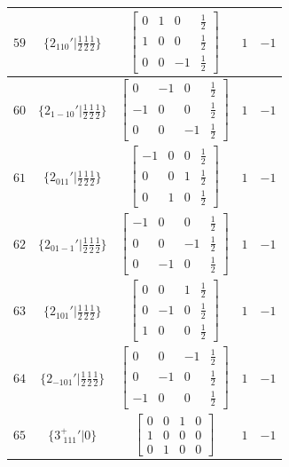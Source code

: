 \documentclass[fleqn,8pt]{jsarticle}
\begin{document}
\begin{longtable}{ccccc}
$ 59 $ & $ \{2{}_{110}{}'|\frac{1}{2} \frac{1}{2} \frac{1}{2}\} $ & $ \begin{bmatrix} 0 & 1 & 0 & \frac{1}{2} \\ 1 & 0 & 0 & \frac{1}{2} \\ 0 & 0 & -1 & \frac{1}{2} \end{bmatrix} $ & $ 1 $ & $ -1 $ \\ \hline
$ 60 $ & $ \{2{}_{1-10}{}'|\frac{1}{2} \frac{1}{2} \frac{1}{2}\} $ & $ \begin{bmatrix} 0 & -1 & 0 & \frac{1}{2} \\ -1 & 0 & 0 & \frac{1}{2} \\ 0 & 0 & -1 & \frac{1}{2} \end{bmatrix} $ & $ 1 $ & $ -1 $ \\ \hline
$ 61 $ & $ \{2{}_{011}{}'|\frac{1}{2} \frac{1}{2} \frac{1}{2}\} $ & $ \begin{bmatrix} -1 & 0 & 0 & \frac{1}{2} \\ 0 & 0 & 1 & \frac{1}{2} \\ 0 & 1 & 0 & \frac{1}{2} \end{bmatrix} $ & $ 1 $ & $ -1 $ \\ \hline
$ 62 $ & $ \{2{}_{01-1}{}'|\frac{1}{2} \frac{1}{2} \frac{1}{2}\} $ & $ \begin{bmatrix} -1 & 0 & 0 & \frac{1}{2} \\ 0 & 0 & -1 & \frac{1}{2} \\ 0 & -1 & 0 & \frac{1}{2} \end{bmatrix} $ & $ 1 $ & $ -1 $ \\ \hline
$ 63 $ & $ \{2{}_{101}{}'|\frac{1}{2} \frac{1}{2} \frac{1}{2}\} $ & $ \begin{bmatrix} 0 & 0 & 1 & \frac{1}{2} \\ 0 & -1 & 0 & \frac{1}{2} \\ 1 & 0 & 0 & \frac{1}{2} \end{bmatrix} $ & $ 1 $ & $ -1 $ \\ \hline
$ 64 $ & $ \{2{}_{-101}{}'|\frac{1}{2} \frac{1}{2} \frac{1}{2}\} $ & $ \begin{bmatrix} 0 & 0 & -1 & \frac{1}{2} \\ 0 & -1 & 0 & \frac{1}{2} \\ -1 & 0 & 0 & \frac{1}{2} \end{bmatrix} $ & $ 1 $ & $ -1 $ \\ \hline
$ 65 $ & $ \{3^{+}_{\,\,111}{}'|0\} $ & $ \begin{bmatrix} 0 & 0 & 1 & 0 \\ 1 & 0 & 0 & 0 \\ 0 & 1 & 0 & 0 \end{bmatrix} $ & $ 1 $ & $ -1 $ \\ \hline

\end{longtable}
\end{document}
